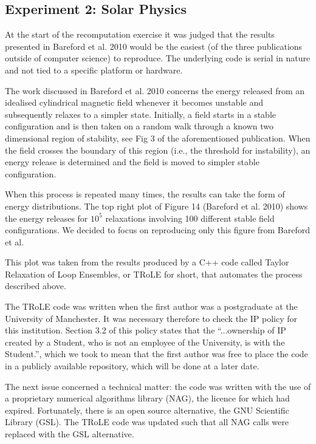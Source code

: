\subsection*{Experiment 2: Solar Physics}

At the start of the recomputation exercise it was judged that the results presented in Bareford et al. 2010
would be the easiest (of the three publications outside of computer science) to reproduce. The underlying
code is serial in nature and not tied to a specific platform or hardware. 

The work discussed in Bareford et al. 2010 concerns the energy released from an idealised cylindrical magnetic
field whenever it becomes unstable and subsequently relaxes to a simpler state. Initially, a field starts in a
stable configuration and is then taken on a random walk through a known two dimensional region of stability, see Fig 3 of
the aforementioned publication. When the field crosses the boundary of this region (i.e., the threshold for instability),
an energy release is determined and the field is moved to simpler stable configuration. 

When this process is repeated many times, the results can take the form of energy distributions. The top right plot
of Figure 14 (Bareford et al. 2010) shows the energy releases for $10^5$ relaxations involving 100 different stable field
configurations. We decided to focus on reproducing only this figure from Bareford et al.

This plot was taken from the results produced by a C++ code called Taylor Relaxation of Loop Ensembles, or TRoLE
for short, that automates the process described above.

The TRoLE code was written when the first author was a postgraduate at the University of Manchester. It was
necessary therefore to check the IP policy for this institution. Section 3.2 of this policy states that the ``...ownership
of IP created by a Student, who is not an employee of the University, is with the Student.'', which we took to mean
that the first author was free to place the code in a publicly available repository, which will be done at a later date.

The next issue concerned a technical matter: the code was written with the use of a proprietary numerical algorithms
library (NAG), the licence for which had expired. Fortunately, there is an open source alternative, the GNU Scientific
Library (GSL). The TRoLE code was updated such that all NAG calls were replaced with the GSL alternative. 

